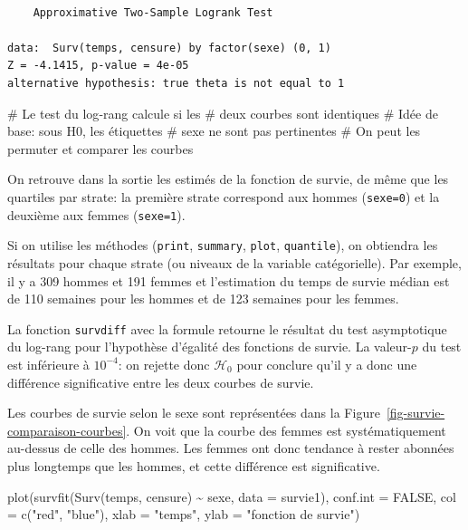 \documentclass[
  11pt,
  letterpaper,
]{book}
\newenvironment{Shaded}{\begin{snugshade}}{\end{snugshade}}
\newcommand{\AttributeTok}[1]{\textcolor[rgb]{0.40,0.45,0.13}{#1}}
\newcommand{\CommentTok}[1]{\textcolor[rgb]{0.37,0.37,0.37}{#1}}
\newcommand{\ConstantTok}[1]{\textcolor[rgb]{0.56,0.35,0.01}{#1}}
\newcommand{\FunctionTok}[1]{\textcolor[rgb]{0.28,0.35,0.67}{#1}}
\newcommand{\NormalTok}[1]{\textcolor[rgb]{0.00,0.23,0.31}{#1}}
\newcommand{\SpecialCharTok}[1]{\textcolor[rgb]{0.37,0.37,0.37}{#1}}
\newcommand{\StringTok}[1]{\textcolor[rgb]{0.13,0.47,0.30}{#1}}
\theoremstyle{definition}
\theoremstyle{remark}
\begin{document}
\begin{verbatim}

    Approximative Two-Sample Logrank Test

data:  Surv(temps, censure) by factor(sexe) (0, 1)
Z = -4.1415, p-value = 4e-05
alternative hypothesis: true theta is not equal to 1
\end{verbatim}

\begin{Shaded}
\begin{Highlighting}[]
\CommentTok{\# Le test du log{-}rang calcule si les }
\CommentTok{\#  deux courbes sont identiques}
\CommentTok{\# Idée de base: sous H0, les étiquettes }
\CommentTok{\#  \textquotesingle{}sexe\textquotesingle{} ne sont pas pertinentes}
\CommentTok{\#  On peut les permuter et comparer les courbes}
\end{Highlighting}
\end{Shaded}

On retrouve dans la sortie les estimés de la fonction de survie, de même
que les quartiles par strate: la première strate correspond aux hommes
(\texttt{sexe=0}) et la deuxième aux femmes (\texttt{sexe=1}).

Si on utilise les méthodes (\texttt{print}, \texttt{summary},
\texttt{plot}, \texttt{quantile}), on obtiendra les résultats pour
chaque strate (ou niveaux de la variable catégorielle). Par exemple, il
y a 309 hommes et 191 femmes et l'estimation du temps de survie médian
est de 110 semaines pour les hommes et de 123 semaines pour les femmes.

La fonction \texttt{survdiff} avec la formule retourne le résultat du
test asymptotique du log-rang pour l'hypothèse d'égalité des fonctions
de survie. La valeur-\(p\) du test est inférieure à \(10^{-4}\): on
rejette donc \(\mathscr{H}_0\) pour conclure qu'il y a donc une
différence significative entre les deux courbes de survie.

Les courbes de survie selon le sexe sont représentées dans la
Figure~\ref{fig-survie-comparaison-courbes}. On voit que la courbe des
femmes est systématiquement au-dessus de celle des hommes. Les femmes
ont donc tendance à rester abonnées plus longtemps que les hommes, et
cette différence est significative.

\begin{Shaded}
\begin{Highlighting}[]
\FunctionTok{plot}\NormalTok{(}\FunctionTok{survfit}\NormalTok{(}\FunctionTok{Surv}\NormalTok{(temps, censure) }\SpecialCharTok{\textasciitilde{}}\NormalTok{ sexe, }
             \AttributeTok{data =}\NormalTok{ survie1), }
     \AttributeTok{conf.int =} \ConstantTok{FALSE}\NormalTok{,}
     \AttributeTok{col =} \FunctionTok{c}\NormalTok{(}\StringTok{"red"}\NormalTok{, }\StringTok{"blue"}\NormalTok{), }
     \AttributeTok{xlab =} \StringTok{"temps"}\NormalTok{, }
     \AttributeTok{ylab =} \StringTok{"fonction de survie"}\NormalTok{)}
\end{Highlighting}
\end{Shaded}
\end{document}
